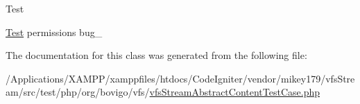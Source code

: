 \begin{DoxyRefDesc}{Test}
\item[\mbox{\hyperlink{test__test000017}{Test}}]permissions  bug\+\_ \end{DoxyRefDesc}


The documentation for this class was generated from the following file\+:\begin{DoxyCompactItemize}
\item 
/\+Applications/\+X\+A\+M\+P\+P/xamppfiles/htdocs/\+Code\+Igniter/vendor/mikey179/vfs\+Stream/src/test/php/org/bovigo/vfs/\mbox{\hyperlink{vfs_stream_abstract_content_test_case_8php}{vfs\+Stream\+Abstract\+Content\+Test\+Case.\+php}}\end{DoxyCompactItemize}
